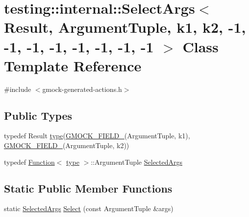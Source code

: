 \hypertarget{classtesting_1_1internal_1_1SelectArgs_3_01Result_00_01ArgumentTuple_00_01k1_00_01k2_00_01-1_00_9a332764141890440172b7f06e77bbee}{}\section{testing\+::internal\+::Select\+Args$<$ Result, Argument\+Tuple, k1, k2, -\/1, -\/1, -\/1, -\/1, -\/1, -\/1, -\/1, -\/1 $>$ Class Template Reference}
\label{classtesting_1_1internal_1_1SelectArgs_3_01Result_00_01ArgumentTuple_00_01k1_00_01k2_00_01-1_00_9a332764141890440172b7f06e77bbee}


{\ttfamily \#include $<$gmock-\/generated-\/actions.\+h$>$}

\subsection*{Public Types}
\begin{DoxyCompactItemize}
\item 
typedef Result \mbox{\hyperlink{classtesting_1_1internal_1_1SelectArgs_3_01Result_00_01ArgumentTuple_00_01k1_00_01k2_00_01-1_00_9a332764141890440172b7f06e77bbee_a469a6dd6962fc4d816bc1ca254c55d50}{type}}(\mbox{\hyperlink{gmock-generated-actions_8h_a6eb3ce92b0613603057a20ec9e593317}{G\+M\+O\+C\+K\+\_\+\+F\+I\+E\+L\+D\+\_\+}}(Argument\+Tuple, k1), \mbox{\hyperlink{gmock-generated-actions_8h_a6eb3ce92b0613603057a20ec9e593317}{G\+M\+O\+C\+K\+\_\+\+F\+I\+E\+L\+D\+\_\+}}(Argument\+Tuple, k2))
\item 
typedef \mbox{\hyperlink{structtesting_1_1internal_1_1Function}{Function}}$<$ \mbox{\hyperlink{classtesting_1_1internal_1_1SelectArgs_3_01Result_00_01ArgumentTuple_00_01k1_00_01k2_00_01-1_00_9a332764141890440172b7f06e77bbee_a469a6dd6962fc4d816bc1ca254c55d50}{type}} $>$\+::Argument\+Tuple \mbox{\hyperlink{classtesting_1_1internal_1_1SelectArgs_3_01Result_00_01ArgumentTuple_00_01k1_00_01k2_00_01-1_00_9a332764141890440172b7f06e77bbee_a38c94bd44f857c5e1d4136f7a283e3e1}{Selected\+Args}}
\end{DoxyCompactItemize}
\subsection*{Static Public Member Functions}
\begin{DoxyCompactItemize}
\item 
static \mbox{\hyperlink{classtesting_1_1internal_1_1SelectArgs_3_01Result_00_01ArgumentTuple_00_01k1_00_01k2_00_01-1_00_9a332764141890440172b7f06e77bbee_a38c94bd44f857c5e1d4136f7a283e3e1}{Selected\+Args}} \mbox{\hyperlink{classtesting_1_1internal_1_1SelectArgs_3_01Result_00_01ArgumentTuple_00_01k1_00_01k2_00_01-1_00_9a332764141890440172b7f06e77bbee_ab9239ba0c8afd6d36332fe5f65f12e5a}{Select}} (const Argument\+Tuple \&args)
\end{DoxyCompactItemize}


